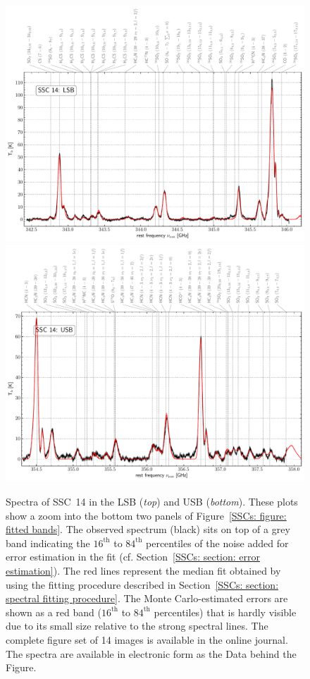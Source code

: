 \begin{figure}
    \centering
    \includegraphics[height=0.4\textheight]{images/chapters/papers/SSCs/SSC_14.LSB.spectrum.pdf}
    \includegraphics[height=0.4\textheight]{images/chapters/papers/SSCs/SSC_14.USB.spectrum.pdf}
    \caption[Spectra of SSC~14]{Spectra of SSC~14 in the LSB (\emph{top}) and USB (\emph{bottom}). These plots show a zoom into the bottom two panels of Figure~\ref{SSCs: figure: fitted bands}. The observed spectrum (black) sits on top of a grey band indicating the $16^\mathrm{th}$ to $84^\mathrm{th}$ percentiles of the noise added for error estimation in the fit (cf. Section~\ref{SSCs: section: error estimation}). The red lines represent the median fit obtained by \xclass using the fitting procedure described in Section~\ref{SSCs: section: spectral fitting procedure}. The Monte Carlo-estimated errors are shown as a red band ($16^\mathrm{th}$ to $84^\mathrm{th}$ percentiles) that is hardly visible due to its small size relative to the strong spectral lines. 
    The complete figure set of 14 images is available in the online journal. The spectra are available in electronic form as the Data behind the Figure.}
    \label{SSCs: figure: sample spectrum}
\end{figure}


